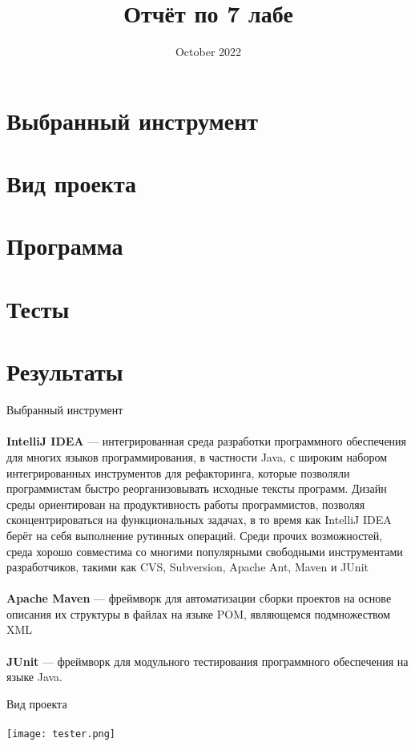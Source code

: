 \documentclass{article}
\title{Отчёт по 7 лабе}
\date{October 2022}
\begin{document}
\maketitle

\section{Выбранный инструмент}
\section{Вид проекта}
\section{Программа}
\section{Тесты}
\section{Результаты}

\newpage
\huge {Выбранный инструмент} \\ \\
\large {\textbf{IntelliJ IDEA} — интегрированная среда разработки программного обеспечения для многих языков программирования, в частности Java, с широким набором интегрированных инструментов для рефакторинга, которые позволяли программистам быстро реорганизовывать исходные тексты программ. Дизайн среды ориентирован на продуктивность работы программистов, позволяя сконцентрироваться на функциональных задачах, в то время как IntelliJ IDEA берёт на себя выполнение рутинных операций. Среди прочих возможностей, среда хорошо совместима со многими популярными свободными инструментами разработчиков, такими как CVS, Subversion, Apache Ant, Maven и JUnit}
\\ \\
\large{\textbf{Apache Maven} — фреймворк для автоматизации сборки проектов на основе описания их структуры в файлах на языке POM, являющемся подмножеством XML}
\\ \\
\large{\textbf{JUnit} — фреймворк для модульного тестирования программного обеспечения на языке Java.}

\newpage
\huge{Вид проекта} \\ \\
\texttt{[image: tester.png]}
\end{document}
